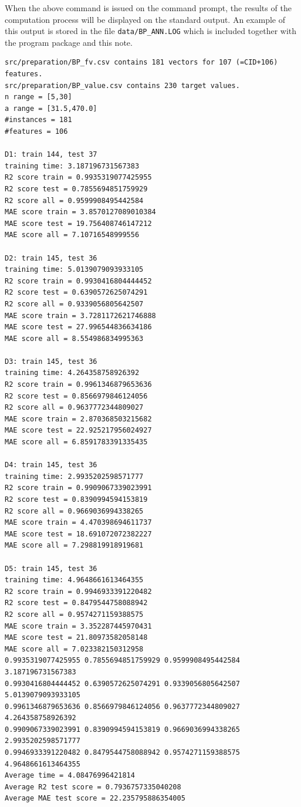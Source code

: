\documentclass[11pt, titlepage, dvipdfmx, twoside]{article}
\begin{document}
When the above command is issued on the command prompt,
the results of the computation process will be displayed on the 
standard output.
An example of this output is stored in the file
\verb|data/BP_ANN.LOG| which is included together with
the program package and this note.
\begin{oframed}
  {\small
\begin{verbatim}
src/preparation/BP_fv.csv contains 181 vectors for 107 (=CID+106) features.
src/preparation/BP_value.csv contains 230 target values.
n range = [5,30]
a range = [31.5,470.0]
#instances = 181
#features = 106

D1: train 144, test 37
training time: 3.187196731567383
R2 score train = 0.9935319077425955
R2 score test = 0.7855694851759929
R2 score all = 0.9599908495442584
MAE score train = 3.8570127089010384
MAE score test = 19.756408746147212
MAE score all = 7.10716548999556

D2: train 145, test 36
training time: 5.0139079093933105
R2 score train = 0.9930416804444452
R2 score test = 0.6390572625074291
R2 score all = 0.9339056805642507
MAE score train = 3.7281172621746888
MAE score test = 27.996544836634186
MAE score all = 8.554986834995363

D3: train 145, test 36
training time: 4.264358758926392
R2 score train = 0.9961346879653636
R2 score test = 0.8566979846124056
R2 score all = 0.9637772344809027
MAE score train = 2.870368503215682
MAE score test = 22.925217956024927
MAE score all = 6.8591783391335435

D4: train 145, test 36
training time: 2.9935202598571777
R2 score train = 0.9909067339023991
R2 score test = 0.8390994594153819
R2 score all = 0.9669036994338265
MAE score train = 4.470398694611737
MAE score test = 18.691072072382227
MAE score all = 7.298819918919681

D5: train 145, test 36
training time: 4.9648661613464355
R2 score train = 0.9946933391220482
R2 score test = 0.8479544758088942
R2 score all = 0.9574271159388575
MAE score train = 3.352287445970431
MAE score test = 21.80973582058148
MAE score all = 7.023382150312958
0.9935319077425955 0.7855694851759929 0.9599908495442584 3.187196731567383
0.9930416804444452 0.6390572625074291 0.9339056805642507 5.0139079093933105
0.9961346879653636 0.8566979846124056 0.9637772344809027 4.264358758926392
0.9909067339023991 0.8390994594153819 0.9669036994338265 2.9935202598571777
0.9946933391220482 0.8479544758088942 0.9574271159388575 4.9648661613464355
Average time = 4.08476996421814
Average R2 test score = 0.7936757335040208
Average MAE test score = 22.235795886354005
  \end{verbatim}        
}
\end{oframed}
\end{document}
